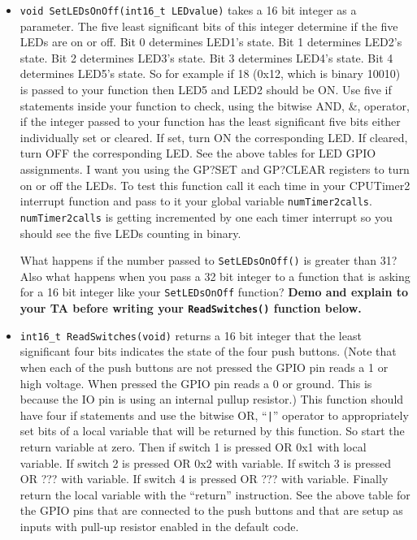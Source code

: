 \documentclass[11pt]{article}
\begin{document}
\begin{enumerate}
        \begin{itemize}
                \item \texttt{void SetLEDsOnOff(int16_t LEDvalue)} takes a 16 bit integer as a parameter. The five least significant bits of this integer determine if the five LEDs are on or off. Bit 0 determines LED1’s state. Bit 1 determines LED2’s state. Bit 2 determines LED3’s state. Bit 3 determines LED4’s state. Bit 4 determines LED5’s state. So for example if 18 (0x12, which is binary 10010) is passed to your function then LED5 and LED2 should be ON. Use five if statements inside your function to check, using the bitwise AND, \&, operator, if the integer passed to your function has the least significant five bits either individually set or cleared. If set, turn ON the corresponding LED. If cleared, turn OFF the corresponding LED. See the above tables for LED GPIO assignments. I want you using the GP?SET and GP?CLEAR registers to turn on or off the LEDs. To test this function call it each time in your CPUTimer2 interrupt function and pass to it your global variable \texttt{numTimer2calls}. \texttt{numTimer2calls} is getting incremented by one each timer interrupt so you should see the five LEDs counting in binary.
                \begin{checkoff}
                        What happens if the number passed to \texttt{SetLEDsOnOff()} is greater than 31? Also what happens when you pass a 32 bit integer to a function that is asking for a 16 bit integer like your \texttt{SetLEDsOnOff} function? {\bfseries Demo and explain to your TA before writing your \texttt{ReadSwitches()} function below.}
                \end{checkoff}
                \item \texttt{int16_t ReadSwitches(void)} returns a 16 bit integer that the least significant four bits indicates the state of the four push buttons. (Note that when each of the push buttons are not pressed the GPIO pin reads a 1 or high voltage. When pressed the GPIO pin reads a 0 or ground. This is because the IO pin is using an internal pullup resistor.) This function should have four if statements and use the bitwise OR, “\texttt{|}” operator to appropriately set bits of a local variable that will be returned by this function. So start the return variable at zero. Then if switch 1 is pressed OR 0x1 with local variable. If switch 2 is pressed OR 0x2 with variable. If switch 3 is pressed OR ??? with variable. If switch 4 is pressed OR ??? with variable. Finally return the local variable with the “return” instruction. See the above table for the GPIO pins that are connected to the push buttons and that are setup as inputs with pull-up resistor enabled in the default code.

\end{itemize}
\end{enumerate}
\end{document}
